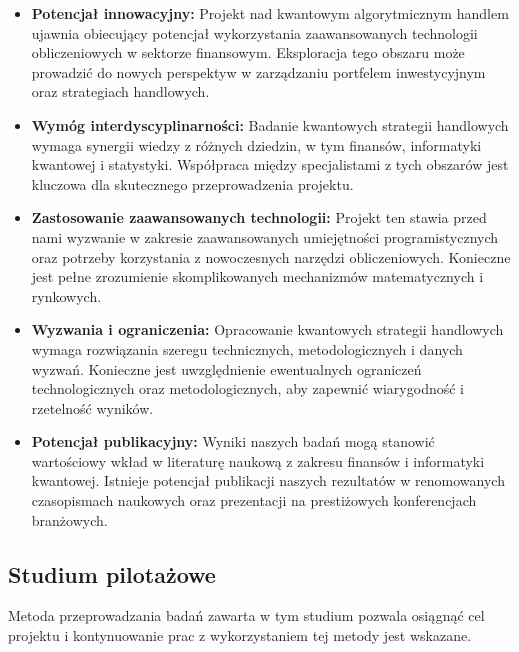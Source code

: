 \documentclass[polish,envcountsect,10pt]{article}
\begin{document}
\begin{itemize}
    \item \textbf{Potencjał innowacyjny:} Projekt nad kwantowym algorytmicznym handlem ujawnia obiecujący potencjał wykorzystania zaawansowanych technologii obliczeniowych w sektorze finansowym. Eksploracja tego obszaru może prowadzić do nowych perspektyw w zarządzaniu portfelem inwestycyjnym oraz strategiach handlowych.
    
    \item \textbf{Wymóg interdyscyplinarności:} Badanie kwantowych strategii handlowych wymaga synergii wiedzy z różnych dziedzin, w tym finansów, informatyki kwantowej i statystyki. Współpraca między specjalistami z tych obszarów jest kluczowa dla skutecznego przeprowadzenia projektu.
    
    \item \textbf{Zastosowanie zaawansowanych technologii:} Projekt ten stawia przed nami wyzwanie w zakresie zaawansowanych umiejętności programistycznych oraz potrzeby korzystania z nowoczesnych narzędzi obliczeniowych. Konieczne jest pełne zrozumienie skomplikowanych mechanizmów matematycznych i rynkowych.
    
    \item \textbf{Wyzwania i ograniczenia:} Opracowanie kwantowych strategii handlowych wymaga rozwiązania szeregu technicznych, metodologicznych i danych wyzwań. Konieczne jest uwzględnienie ewentualnych ograniczeń technologicznych oraz metodologicznych, aby zapewnić wiarygodność i rzetelność wyników.
    
    \item \textbf{Potencjał publikacyjny:} Wyniki naszych badań mogą stanowić wartościowy wkład w literaturę naukową z zakresu finansów i informatyki kwantowej. Istnieje potencjał publikacji naszych rezultatów w renomowanych czasopismach naukowych oraz prezentacji na prestiżowych konferencjach branżowych.
\end{itemize}

\subsection{Studium pilotażowe}

Metoda przeprowadzania badań zawarta w tym studium pozwala osiągnąć cel projektu i kontynuowanie prac z wykorzystaniem tej metody jest wskazane.



\nocite{*}
\printbibliography
\end{document}

